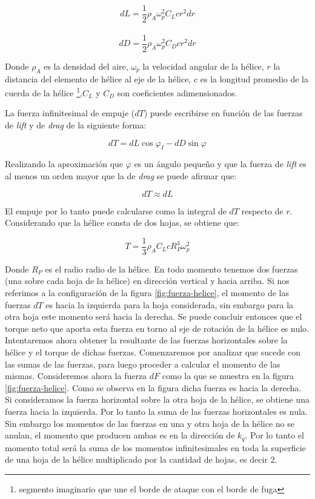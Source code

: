 \documentclass[main]{subfiles}
\begin{document}
$$
dL=\frac{1}{2}\rho_A \omega_p^2 C_L c r^2dr$$\\

$$
dD=\frac{1}{2}\rho_A \omega_p^2 C_D c r^2dr
$$

Donde $\rho_A$ es la densidad del aire, $\omega_p$ la velocidad angular de la h\'elice, $r$ la distancia del elemento de h\'elice al eje de la h\'elice, c es la longitud promedio de la cuerda de la h\'elice \footnote{segmento imaginario que une el borde de ataque con el borde de fuga },$ C_L$ y $C_D$ son coeficientes adimensionados.

La fuerza infinitesimal de empuje ($dT$) puede escribirse en funci\'on de las fuerzas de \emph{lift} y de \emph{drag} de la siguiente forma:

$$dT=dL\cos\varphi_I-dD\sin\varphi$$

Realizando la aproximaci\'on que $\varphi$ es un \'angulo peque\~no y que la fuerza de \emph{lift} es al menos un orden mayor que la de \emph{drag} se puede afirmar que:

$$dT\approx dL
$$

El empuje por lo tanto puede calcularse como la integral de $dT$ respecto de $r$. Considerando que la h\'elice consta de dos hojas, se obtiene que:

\begin{equation}
\label{eq:fuerza}
T=\frac{1}{3}\rho_A C_L c R_P^3\omega_p^2
\end{equation}


Donde $R_P$ es el radio radio de la h\'elice. En todo momento tenemos dos fuerzas (una sobre cada hoja de la h\'elice) en direcci\'on vertical y hacia arriba. Si nos referimos a la configuraci\'on de la figura \ref{fig:fuerza-helice}, el momento de las fuerzas $dT$ es hacia la izquierda para la hoja considerada, sin embargo para la otra hoja este momento ser\'a hacia la derecha. Se puede concluir entonces que el torque neto que aporta esta fuerza en torno al eje de rotaci\'on de la h\'elice es nulo.\\   

Intentaremos ahora obtener la resultante de las fuerzas horizontales sobre la h\'elice y el torque de dichas fuerzas. Comenzaremos por analizar que sucede con las sumas de las fuerzas, para luego proceder a calcular el momento de las mismas. Consideremos ahora la fuerza $dF$ como la que se muestra en la figura \ref{fig:fuerza-helice}. Como se observa en la figura dicha fuerza es hacia la derecha. Si consideramos la fuerza horizontal sobre la otra hoja de la h\'elice, se obtiene una fuerza hacia la izquierda. Por lo tanto la suma de las fuerzas horizontales es nula. Sin embargo los momentos de las fuerzas en una y otra hoja de la h\'elice no se anulan, el momento que producen ambas es en la direcci\'on de $k_q$. Por lo tanto el momento total ser\'a la suma de los momentos infinitesimales en toda la superficie de una hoja de la h\'elice multiplicado por la cantidad de hojas, es decir 2. 
\end{document}

